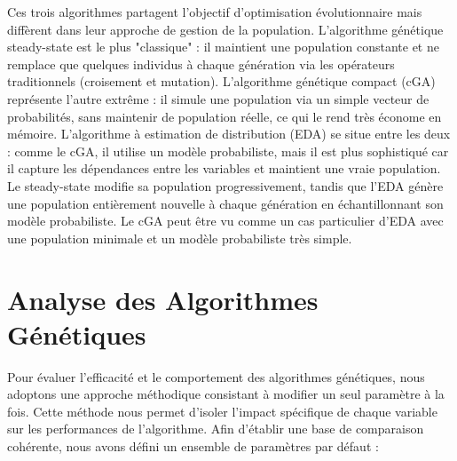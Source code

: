 \documentclass{article}
\begin{document}
Ces trois algorithmes partagent l'objectif d'optimisation évolutionnaire mais diffèrent dans leur approche de gestion de la population. L'algorithme génétique steady-state est le plus "classique" : il maintient une population constante et ne remplace que quelques individus à chaque génération via les opérateurs traditionnels (croisement et mutation). L'algorithme génétique compact (cGA) représente l'autre extrême : il simule une population via un simple vecteur de probabilités, sans maintenir de population réelle, ce qui le rend très économe en mémoire. L'algorithme à estimation de distribution (EDA) se situe entre les deux : comme le cGA, il utilise un modèle probabiliste, mais il est plus sophistiqué car il capture les dépendances entre les variables et maintient une vraie population. Le steady-state modifie sa population progressivement, tandis que l'EDA génère une population entièrement nouvelle à chaque génération en échantillonnant son modèle probabiliste. Le cGA peut être vu comme un cas particulier d'EDA avec une population minimale et un modèle probabiliste très simple.

\section{Analyse des Algorithmes Génétiques}

Pour évaluer l'efficacité et le comportement des algorithmes génétiques, nous adoptons une approche méthodique consistant à modifier un seul paramètre à la fois. Cette méthode nous permet d'isoler l'impact spécifique de chaque variable sur les performances de l'algorithme. Afin d'établir une base de comparaison cohérente, nous avons défini un ensemble de paramètres par défaut :
\end{document}
